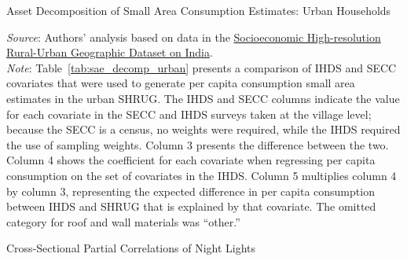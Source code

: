 \documentclass[12pt,letterpaper]{article}
\newcommand{\shrugpath}{.}
\begin{document}
\begin{appendix}
\begin{center}
\begin{table}[H]
    \label{tab:sae_decomp_rural}
  \end{table}
\end{center}

\begin{center}
  \begin{table}[H]
    \caption{Asset Decomposition of Small Area Consumption Estimates: \cnewline Urban Households} 
      \begin{center}
        \scriptsize{}
      \end{center}

    \scriptsize \textit{Source}: Authors' analysis based on data in the \href{http://www.devdatalab.org/shrug}{Socioeconomic High-resolution
      Rural-Urban Geographic Dataset on India}. \\
    \scriptsize \textit{Note}: Table~\ref{tab:sae_decomp_urban} presents a
    comparison of IHDS and SECC covariates that were used to generate
    per capita consumption small area estimates in the urban
    SHRUG. The IHDS and SECC columns indicate the value for each
    covariate in the SECC and IHDS surveys taken at the village level;
    because the SECC is a census, no weights were required, while the
    IHDS required the use of sampling weights. Column 3 presents the
    difference between the two. Column 4 shows the coefficient for
    each covariate when regressing per capita consumption on the set
    of covariates in the IHDS. Column 5 multiplies column 4 by column
    3, representing the expected difference in per capita consumption
    between IHDS and SHRUG that is explained by that covariate. The
    omitted category for roof and wall materials was ``other.''
    \label{tab:sae_decomp_urban}
  \end{table}
\end{center}


\begin{table}[H]
  \caption{Cross-Sectional Partial Correlations of Night Lights} 


\end{table}
\end{appendix}
\end{document}
